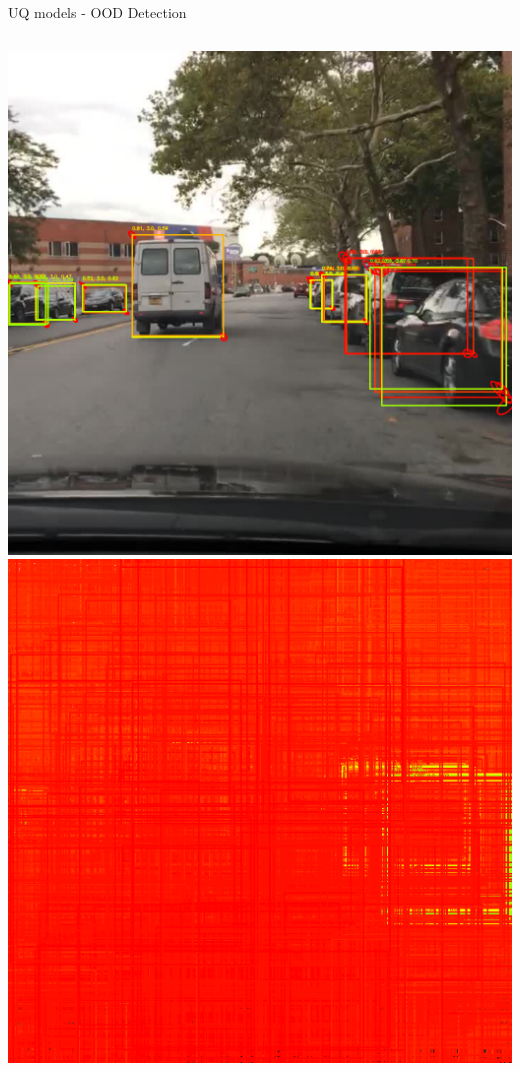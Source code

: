 \documentclass[10pt, aspectratio=169]{beamer}
\begin{document}
\begin{frame}[allowframebreaks]{UQ models - OOD Detection}
        \begin{columns}
            \begin{column}{.2\textwidth}
                \includegraphics[width=\textwidth]{images/uq_weathers/SubEns_Variance2.png}
                \includegraphics[width=\textwidth]{images/uq_weathers/SubEns_entropies_all2.png}

\end{column}
\end{columns}
\end{frame}
\end{document}
